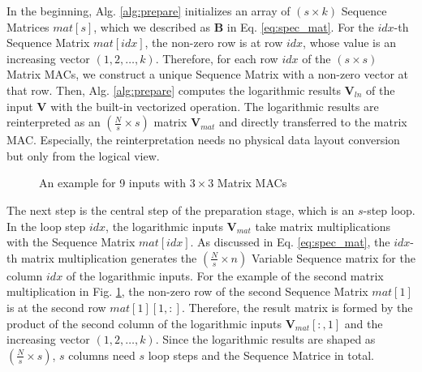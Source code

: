 \documentclass[12pt]{extbook}
\begin{document}
In the beginning, Alg. \ref{alg:prepare} initializes an array of $(s \times k)$ Sequence Matrices $mat[s]$, which we described as $\textbf{B}$ in Eq. \ref{eq:spec_mat}. For the $idx$-th Sequence Matrix $mat[idx]$, the non-zero row is at row $idx$, whose value is an increasing vector $(1, 2, \dots, k)$. Therefore, for each row $idx$ of the $(s \times s)$ Matrix MACs, we construct a unique Sequence Matrix with a non-zero vector at that row. Then, Alg. \ref{alg:prepare} computes the logarithmic results $\textbf{V}_{ln}$ of the input $\textbf{V}$ with the built-in vectorized operation. The logarithmic results are reinterpreted as an $(\frac{N}{s} \times s)$ matrix $\textbf{V}_{mat}$ and directly transferred to the matrix MAC. Especially, the reinterpretation needs no physical data layout conversion but only from the logical view. 

\begin{figure}[t]
    \caption{An example for 9 inputs with $3 \times 3$ Matrix MACs}
    \label{fig:trans_ln}
    \end{figure}

The next step is the central step of the preparation stage, which is an $s$-step loop. In the loop step $idx$, the logarithmic inputs $\textbf{V}_{mat}$ take matrix multiplications with the Sequence Matrix $mat[idx]$. As discussed in Eq. \ref{eq:spec_mat}, the $idx$-th matrix multiplication generates the $(\frac{N}{s} \times n)$ Variable Sequence matrix for the column $idx$ of the logarithmic inputs. For the example of the second matrix multiplication in Fig. \ref{fig:trans_ln}, the non-zero row of the second Sequence Matrix $mat[1]$ is at the second row $mat[1][1, :]$. Therefore, the result matrix is formed by the product of the second column of the logarithmic inputs $\textbf{V}_{mat}[:, 1]$ and the increasing vector $(1, 2, \dots, k)$. Since the logarithmic results are shaped as $(\frac{N}{s} \times s)$, $s$ columns need $s$ loop steps and the Sequence Matrice in total.
\end{document}
